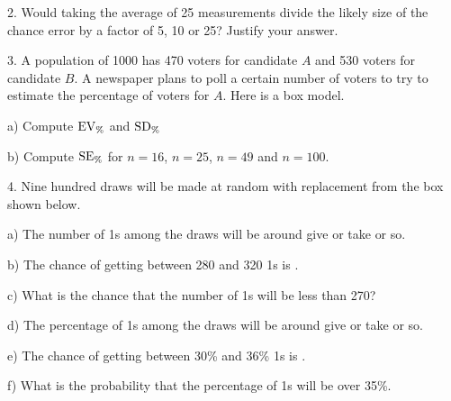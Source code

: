 \documentclass[10pt]{article}
\begin{document}
2. Would taking the average of 25 measurements divide the likely size of the chance error by a factor of 5, 10 or 25? Justify your answer.
\vspace{1in}

3. A population of 1000 has 470 voters for candidate $A$ and 530 voters for candidate $B$.
A newspaper plans to poll a certain number of voters to try to estimate the percentage of 
voters for $A$.  Here is a box model.\vspace{-20pt}

\begin{center}
\end{center}\vspace{-5pt}

\hspace{20pt} a) Compute $\mbox{EV}_{\scriptsize\%}$ and $\mbox{SD}_{\scriptsize\%}$
\vspace{1.5in}

\hspace{20pt} b) 
Compute 
$\mbox{SE}_{\scriptsize\%}$ for $n=16$, $n=25$, $n=49$ and $n=100$.  \vspace{-3pt}
\vfill
\eject
{\ }


4. Nine hundred draws will be made at random with replacement
from the box shown below.
\begin{center}
\end{center}
\medskip

\hspace{10pt} a) 
The number of 1s among the draws will be around \underline{\hspace{45pt}} 
give or take \underline{\hspace{45pt}}  or so.
\vspace{1.25in}

\hspace{10pt} b) The chance of getting between 280 and 320 1s is \underline{\hspace{45pt}}.
\vspace{1.25in}

\hspace{10pt} c) What is the chance that the number of 1s will be less than 270?
\vspace{1.1in}

\hspace{10pt} d) 
The percentage of 1s among the draws will be around \underline{\hspace{45pt}} 
give or take \underline{\hspace{45pt}}  or so.
\vspace{1.25in}

\hspace{10pt} e) The chance of getting between 30\% and 36\% 1s is \underline{\hspace{45pt}}.
\vspace{1.25in}


\hspace{10pt} f) What is the probability that the percentage of 1s will 
be over 35\%.



\vfill
\eject
\end{document}
